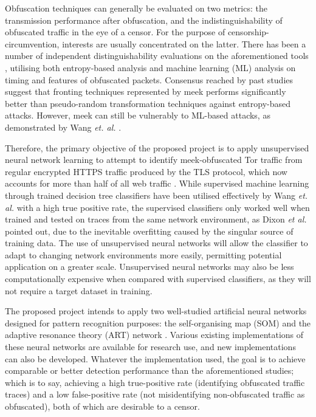 \documentclass[11pt]{article}
\begin{document}
Obfuscation techniques can generally be evaluated on two metrics: the transmission performance after obfuscation, and the indistinguishability of obfuscated traffic in the eye of a censor. For the purpose of censorship-circumvention, interests are usually concentrated on the latter. There has been a number of independent distinguishability evaluations on the aforementioned tools  \cite{wang2015seeing} \cite{houmansadr2013parrot} \cite{tan2015towards}, utilising both entropy-based analysis and machine learning (ML) analysis on timing and features of obfuscated packets. Consensus reached by past studies suggest that fronting techniques represented by meek performs significantly better than pseudo-random transformation techniques against entropy-based attacks. However, meek can still be vulnerably to ML-based attacks, as demonstrated by Wang \emph{et. al.} \cite[Sec. 6]{wang2015seeing}. 

Therefore, the primary objective of the proposed project is to apply unsupervised neural network learning to attempt to identify meek-obfuscated Tor traffic from regular encrypted HTTPS traffic produced by the TLS protocol, which now accounts for more than half of all web traffic \cite{encrypted-web}. While supervised machine learning through trained decision tree classifiers have been utilised effectively by Wang \emph{et. al.} \cite[Tb. 8]{wang2015seeing} with a high true positive rate, the supervised classifiers only worked well when trained and tested on traces from the same network environment, as Dixon \emph{et al.} \cite{dixon2016network} pointed out, due to the inevitable overfitting caused by the singular source of training data. The use of unsupervised neural networks will allow the classifier to adapt to changing network environments more easily, permitting potential application on a greater scale. Unsupervised neural networks may also be less computationally expensive when compared with supervised classifiers, as they will not require a target dataset in training.

The proposed project intends to apply two well-studied artificial neural networks designed for pattern recognition purposes: the self-organising map (SOM) \cite{kohonen1998self} and the adaptive resonance theory (ART) network \cite{carpenter1988art}. Various existing implementations of these neural networks are available for research use, and new implementations can also be developed. Whatever the implementation used, the goal is to achieve comparable or better detection performance than the aforementioned studies; which is to say, achieving a high true-positive rate (identifying obfuscated traffic traces) and a low false-positive rate (not misidentifying non-obfuscated traffic as obfuscated), both of which are desirable to a censor.
\end{document}
